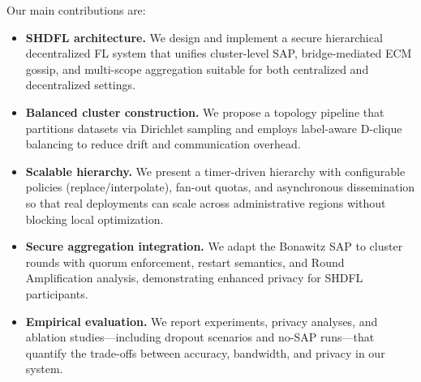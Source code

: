 Our main contributions are:
\begin{itemize}
    \item \textbf{SHDFL architecture.} We design and implement a secure hierarchical decentralized FL system that unifies cluster-level SAP, bridge-mediated ECM gossip, and multi-scope aggregation suitable for both centralized and decentralized settings.
    \item \textbf{Balanced cluster construction.} We propose a topology pipeline that partitions datasets via Dirichlet sampling and employs label-aware D-clique balancing to reduce drift and communication overhead.
    \item \textbf{Scalable hierarchy.} We present a timer-driven hierarchy with configurable policies (replace/interpolate), fan-out quotas, and asynchronous dissemination so that real deployments can scale across administrative regions without blocking local optimization.
    \item \textbf{Secure aggregation integration.} We adapt the Bonawitz SAP to cluster rounds with quorum enforcement, restart semantics, and Round Amplification analysis, demonstrating enhanced privacy for SHDFL participants.
    \item \textbf{Empirical evaluation.} We report experiments, privacy analyses, and ablation studies—including dropout scenarios and no-SAP runs—that quantify the trade-offs between accuracy, bandwidth, and privacy in our system.
\end{itemize}
